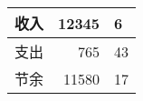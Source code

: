 \begin{tabular}{|c|r@{.}l|}
  \hline
  收入 & 12345&6  \\ \hline
  支出 &   765&43 \\ \hline
  节余 & 11580&17 \\ \hline
\end{tabular}

